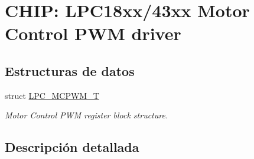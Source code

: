 \hypertarget{group___m_c_p_w_m__18_x_x__43_x_x}{}\section{C\+H\+IP\+: L\+P\+C18xx/43xx Motor Control P\+WM driver}
\label{group___m_c_p_w_m__18_x_x__43_x_x}
\subsection*{Estructuras de datos}
\begin{DoxyCompactItemize}
\item 
struct \hyperlink{struct_l_p_c___m_c_p_w_m___t}{L\+P\+C\+\_\+\+M\+C\+P\+W\+M\+\_\+T}
\begin{DoxyCompactList}\small\item\em Motor Control P\+WM register block structure. \end{DoxyCompactList}\end{DoxyCompactItemize}


\subsection{Descripción detallada}
